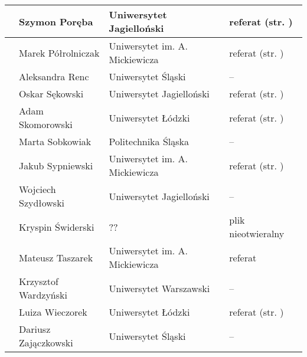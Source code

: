 \documentclass[12pt,oneside]{book}
\begin{document}
\begin{tabular}{||c|l|l|l||}
	 & Szymon Poręba & Uniwersytet Jagielloński & referat (str. \pageref{poreba}) \\\hline
	 & Marek Półrolniczak & Uniwersytet im. A. Mickiewicza & referat (str. \pageref{kolendowicz}) \\\hline
 	 & Aleksandra Renc & Uniwersytet Śląski & -- \\\hline
	 & Oskar Sękowski & Uniwersytet Jagielloński & referat (str. \pageref{sekowski}) \\\hline
	 & Adam Skomorowski & Uniwersytet Łódzki & referat (str. \pageref{skomorowski}) \\\hline	
	 & Marta Sobkowiak & Politechnika Śląska & -- \\\hline
	 & Jakub Sypniewski & Uniwersytet im. A. Mickiewicza & referat (str. \pageref{sypniewski}) \\\hline
	 & Wojciech Szydłowski & Uniwersytet Jagielloński & -- \\\hline
	 & Kryspin Świderski & ?? & plik nieotwieralny \\\hline
	 & Mateusz Taszarek & Uniwersytet im. A. Mickiewicza & referat \\\hline
 	 & Krzysztof Wardzyński & Uniwersytet Warszawski & -- \\\hline
   & Luiza Wieczorek & Uniwersytet Łódzki & referat (str. \pageref{wieczorek}) \\\hline
   & Dariusz Zajączkowski & Uniwersytet Śląski & -- \\\hline
	
\hline
\hline
\end{tabular}

\printindex[a]
%


\backmatter



%
\end{document}
